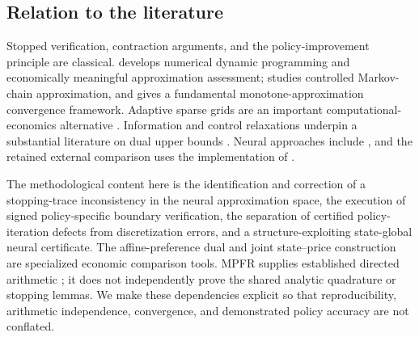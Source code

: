 \subsection{Relation to the literature}
Stopped verification, contraction arguments, and the policy-improvement principle are classical. \citet{Judd1998} develops numerical dynamic programming and economically meaningful approximation assessment; \citet{KushnerDupuis2001} studies controlled Markov-chain approximation, and \citet{BarlesSouganidis1991} gives a fundamental monotone-approximation convergence framework. Adaptive sparse grids are an important computational-economics alternative \citep{BrummScheidegger2017}. Information and control relaxations underpin a substantial literature on dual upper bounds \citep{BrownSmithSun2010,BrownSmith2011}. Neural approaches include \citet{HanE2016,HanJentzenE2018}, and the retained external comparison uses the implementation of \citet{CaiFangZhou2025}.

The methodological content here is the identification and correction of a stopping-trace inconsistency in the neural approximation space, the execution of signed policy-specific boundary verification, the separation of certified policy-iteration defects from discretization errors, and a structure-exploiting state-global neural certificate. The affine-preference dual and joint state--price construction are specialized economic comparison tools. MPFR supplies established directed arithmetic \citep{FousseEtAl2007}; it does not independently prove the shared analytic quadrature or stopping lemmas. We make these dependencies explicit so that reproducibility, arithmetic independence, convergence, and demonstrated policy accuracy are not conflated.
